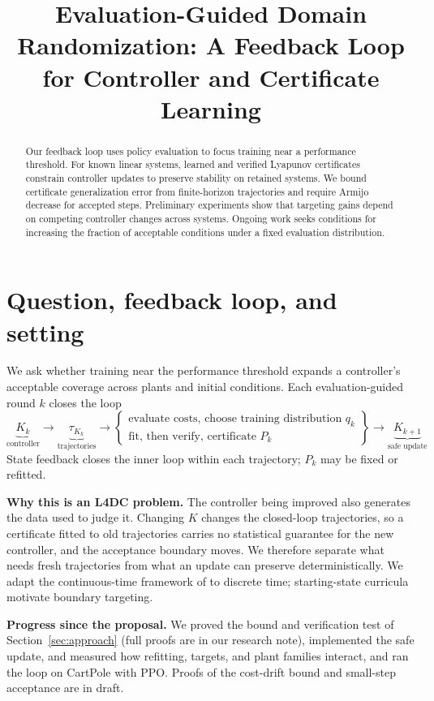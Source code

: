 \documentclass{l4dc2026}
\title[Evaluation-Guided Domain Randomization]{Evaluation-Guided Domain Randomization:\newline
  A Feedback Loop for Controller and Certificate Learning}
\author{\Name{Shimin Chen} \Email{cshimin@engineering.upenn.edu}}
\begin{document}
\maketitle
\begin{abstract}
Our feedback loop uses policy evaluation to focus training near a performance threshold.
For known linear systems, learned and verified Lyapunov certificates constrain
controller updates to preserve stability on retained systems. We bound certificate
generalization error from finite-horizon trajectories and require Armijo decrease for
accepted steps. Preliminary experiments show that targeting gains depend on competing
controller changes across systems. Ongoing work seeks conditions for increasing the
fraction of acceptable conditions under a fixed evaluation distribution.
\end{abstract}

\section{Question, feedback loop, and setting}
We ask whether training near the performance threshold expands a controller's acceptable
coverage across plants and initial conditions. Each evaluation-guided round $k$ closes the loop
\[
 \underbrace{K_k}_{\text{controller}}
 \longrightarrow
 \underbrace{\tau_{K_k}}_{\text{trajectories}}
 \longrightarrow
 \left\{\begin{array}{l}
  \text{evaluate costs, choose training distribution } q_k\\
  \text{fit, then verify, certificate } P_k
 \end{array}\right\}
 \longrightarrow
 \underbrace{K_{k+1}}_{\text{safe update}}
\]
State feedback closes the inner loop within each trajectory; $P_k$ may be fixed or
refitted.

\textbf{Why this is an L4DC problem.}
The controller being improved also generates the data used to judge it. Changing
$K$ changes the closed-loop trajectories, so a certificate fitted to old
trajectories carries no statistical guarantee for the new controller, and the
acceptance boundary moves. We therefore separate what needs fresh trajectories from
what an update can preserve deterministically.
We adapt the continuous-time framework of
\citet[Sections~3--4]{boffi2021learning} to discrete time; starting-state
curricula \citep{florensa2017reverse} motivate boundary targeting.

\textbf{Progress since the proposal.}
We proved the bound and verification test of Section~\ref{sec:approach} (full proofs
are in our research note), implemented the safe update, and measured how refitting,
targets, and plant families interact, and ran the loop on CartPole with PPO. Proofs of the cost-drift bound and small-step acceptance are in draft.
\end{document}
